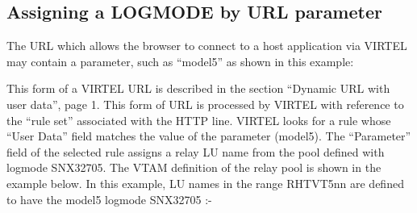 \documentclass[letterpaper,10pt,english]{sphinxmanual}
\begin{document}
\ignorespaces 

\subsection{Assigning a LOGMODE by URL parameter}
\label{\detokenize{Customization:assigning-a-logmode-by-url-parameter}}\label{\detokenize{Customization:index-67}}
The URL which allows the browser to connect to a host application via VIRTEL may contain a parameter, such as “model5” as shown in this example:

\begin{sphinxVerbatim}[commandchars=\\\{\}]
\end{sphinxVerbatim}

This form of a VIRTEL URL is described in the section “Dynamic URL with user data”, page 1. This form of URL is processed by VIRTEL with reference to the “rule set” associated with the HTTP line. VIRTEL looks for a rule whose “User Data” field matches the value of the parameter (model5). The “Parameter” field of the selected rule assigns a relay LU name from the pool defined with logmode SNX32705. The VTAM definition of the relay pool is shown in the example below. In this example, LU names in the range RHTVT5nn are defined to have the
model5 logmode SNX32705 :-
\end{document}
